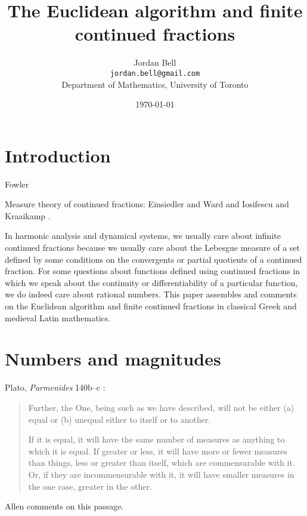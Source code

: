 \documentclass{article}
\begin{document}
\title{The Euclidean algorithm and finite continued fractions}
\author{Jordan Bell\\ \texttt{jordan.bell@gmail.com}\\Department of Mathematics, University of Toronto}
\date{\today}

\maketitle


\section{Introduction}
Fowler \cite{fowler}


Measure theory of continued fractions: Einsiedler and Ward \cite[Chapter 3]{einsiedler}
and Iosifescu and Kraaikamp \cite[Chapter 1]{iosifescu}.

In harmonic analysis and dynamical systems, we usually care about infinite continued fractions because we usually
care about the Lebesgue
measure of a set defined by some conditions on the convergents or partial quotients of a continued fraction. 
For some questions about functions defined using continued fractions in which we speak about the continuity
or differentiability of a particular function, we do indeed care about rational numbers. 
This paper assembles and comments on the Euclidean algorithm and finite continued fractions in 
classical Greek and medieval Latin mathematics.



\section{Numbers and magnitudes}
Plato, {\em Parmenides} 140b--c  \cite[p.~126]{cornford}: 

\begin{quote}
Further, the One, being such as we have described, will
not be either (a) equal or (b) unequal either to itself or to
another.

If it is equal, it will have the same number of measures
as anything to which it is equal. If greater or less, it will
have more or fewer measures than things, less or greater
than itself, which are commensurable with it. Or, if they
are incommensurable with it, it will have smaller measures
in the one case, greater in the other.
\end{quote}

Allen \cite[pp.~236--241]{allen} comments on this passage.
\end{document}
